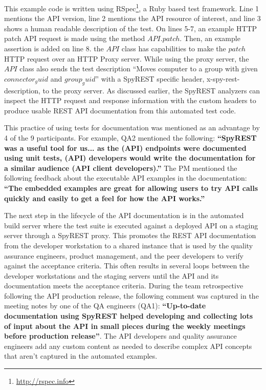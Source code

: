\documentclass[10pt, conference]{IEEEtran}
\begin{document}
This example code is written using RSpec\footnote{\url{http://rspec.info}}, a Ruby based test framework. Line 1 mentions the API version, line 2 mentions the API resource of interest, and line 3 shows a human readable description of the test. On lines 5-7, an example HTTP patch API request is made using the method $API.patch$. Then, an example assertion is added on line 8. the $API$ class has capabilities to make the $patch$ HTTP request over an HTTP Proxy server. While using the proxy server, the $API$ class also sends the test description ``Moves computer to a group with given $connector_guid$ and $group_guid$'' with a SpyREST specific header, x-spy-rest-description, to the proxy server. As discussed earlier, the SpyREST analyzers can inspect the HTTP request and response information with the custom headers to produce usable REST API documentation from this automated test code.

This practice of using tests for documentation was mentioned as an advantage by 4 of the 9 participants. For example, QA2 mentioned the following: \textbf{``SpyREST was a useful tool for us... as the (API) endpoints were documented using unit tests, (API) developers would write the documentation for a similar audience (API client developers).''} The PM mentioned the following feedback about the executable API examples in the documentation: \textbf{``The embedded examples are great for allowing users to try API calls quickly and easily to get a feel for how the API works.''}

The next step in the lifecycle of the API documentation is in the automated build server where the test suite is executed against a deployed API on a staging server through a SpyREST proxy. This promotes the REST API documentation from the developer workstation to a shared instance that is used by the quality assurance engineers, product management, and the peer developers to verify against the acceptance criteria. This often results in several loops between the developer workstations and the staging servers until the API and its documentation meets the acceptance criteria. During the team retrospective following the API production release, the following comment was captured in the meeting notes by one of the QA engineers (QA1):  \textbf{``Up-to-date documentation using SpyREST helped developing and collecting lots of input about the API in small pieces during the weekly meetings before production release''}. The API developers and quality assurance engineers add any custom content as needed to describe complex API concepts that aren't captured in the automated examples.
\end{document}
